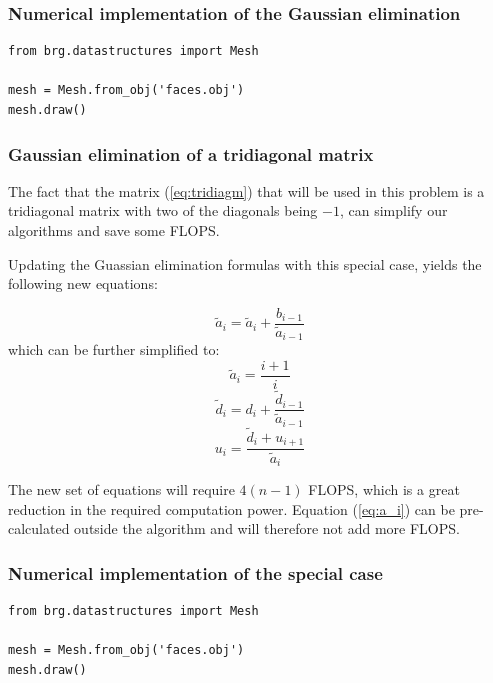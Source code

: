 \documentclass[12pt]{article}
\begin{document}
\subsubsection{Numerical implementation of the Gaussian elimination}

\lstset{language=Python}
\lstset{frame=lines}
\lstset{basicstyle=\footnotesize}
\begin{lstlisting}
from brg.datastructures import Mesh
 
mesh = Mesh.from_obj('faces.obj')
mesh.draw()
\end{lstlisting}

\subsubsection{Gaussian elimination of a tridiagonal matrix}
The fact that the matrix (\ref{eq:tridiagm}) that will be used in this problem is a tridiagonal matrix with two of the diagonals being $-1$, can simplify our algorithms and save some FLOPS.

Updating the Guassian elimination formulas with this special case, yields the following new equations:

\begin{equation}
\tilde{a}_{i}=\tilde{a}_{i}+\frac{b_{i-1}}{\tilde{a}_{i-1}}
\end{equation}
which can be further simplified to:
\begin{equation}
\tilde{a}_{i}=\frac{i+1}{i}
\label{eq:a_i}
\end{equation}
\begin{equation}
\tilde{d}_{i}=d_{i}+\frac{\tilde{d}_{i-1}}{\tilde{a}_{i-1}}
\end{equation}
\begin{equation}
u_{i}=\frac{\tilde{d}_{i}+u_{i+1}}{\tilde{a}_{i}}
\end{equation}

The new set of equations will require $4(n-1)$ FLOPS, which is a great reduction in the required computation power. Equation (\ref{eq:a_i}) can be pre-calculated outside the algorithm and will therefore not add more FLOPS.

\subsubsection{Numerical implementation of the special case}
\lstset{language=Python}
\lstset{frame=lines}
\lstset{basicstyle=\footnotesize}
\begin{lstlisting}
from brg.datastructures import Mesh
 
mesh = Mesh.from_obj('faces.obj')
mesh.draw()
\end{lstlisting}
\end{document}
